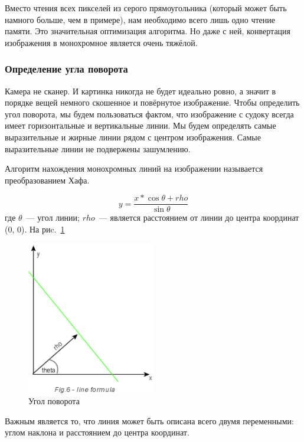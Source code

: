 Вместо чтения всех пикселей из серого прямоугольника (который может быть намного больше, чем в примере), нам необходимо всего лишь одно чтение памяти. Это значительная оптимизация алгоритма. Но даже с ней, конвертация изображения в монохромное является очень тяжёлой. 


\subsubsection{Определение угла поворота}
Камера не сканер. И картинка никогда не будет идеально ровно, а значит в порядке вещей немного скошенное и повёрнутое изображение. Чтобы определить угол поворота, мы будем пользоваться фактом, что изображение с судоку всегда имеет горизонтальные и вертикальные линии. Мы будем определять самые выразительные и жирные линии рядом с центром изображения. Самые выразительные линии не подвержены зашумлению.

Алгоритм нахождения монохромных линий на изображении называется преобразованием Хафа. 

\begin{equation}
\label{f:angleOfRotation}
y = \frac{x * \cos \theta + rho}{\sin \theta}
\end{equation}
где $\theta$~--- угол линии; $rho$~--- является расстоянием от линии до центра координат (0, 0). На риc.~\ref{fig:fig25}

\begin{figure}[ht!]
  \centering
  \includegraphics[width=0.5\textwidth]{inc/raster/design2-5.png}
  \caption{Угол поворота}
  \label{fig:fig25}
\end{figure}

Важным является то, что линия может быть описана всего двумя переменными: углом наклона и расстоянием до центра координат. 

